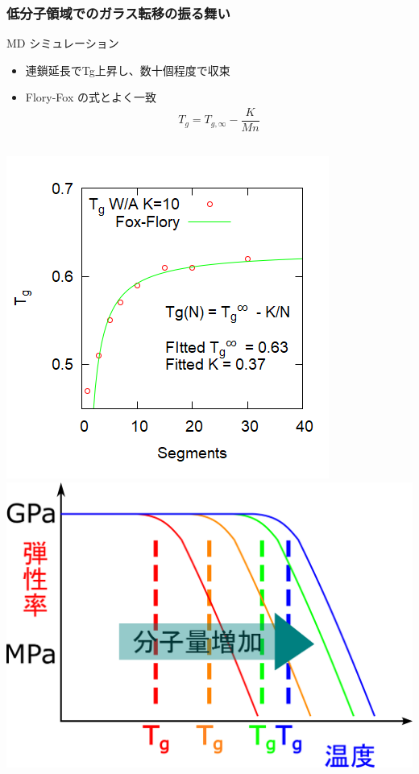 \documentclass[unicode,12pt]{beamer}%
\begin{document}
\begin{frame}
	\frametitle{低分子領域でのガラス転移の振る舞い}
		\begin{block}{MD シミュレーション}
			\begin{itemize}
				\item 連鎖延長でTg上昇し、数十個程度で収束
				\item Flory-Fox の式とよく一致
				\vspace{-1\baselineskip}
					\begin{align*}
						T_g = T_{g,\infty} - \dfrac{K}{Mn}
					\end{align*}
			\end{itemize}
			\vspace{-1\baselineskip}
		\begin{columns}[c, onlytextwidth]
				\centering
				\includegraphics[width=.8\textwidth]{Tg_N_inv.png}
				\centering
				\includegraphics[width=\textwidth]{polymer_spectrum_1.png}
		\end{columns}
	\end{block}
\end{frame}
\end{document}
